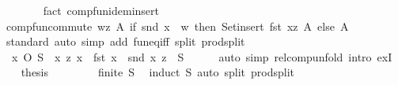 \begin{isabellebody}
\ \ \ \ \ \ \isamarkupfalse%
\ {\isacharparenleft}{\kern0pt}fact\ comp{\isacharunderscore}{\kern0pt}fun{\isacharunderscore}{\kern0pt}idem{\isacharunderscore}{\kern0pt}insert{\isacharparenright}{\kern0pt}\isanewline
\ \ \ \ \isamarkupfalse%
\ {\isachardoublequoteopen}comp{\isacharunderscore}{\kern0pt}fun{\isacharunderscore}{\kern0pt}commute\ {\isacharparenleft}{\kern0pt}{\isasymlambda}{\isacharparenleft}{\kern0pt}w{\isacharcomma}{\kern0pt}z{\isacharparenright}{\kern0pt}\ A{\isacharprime}{\kern0pt}{\isachardot}{\kern0pt}\ if\ snd\ x\ {\isacharequal}{\kern0pt}\ w\ then\ Set{\isachardot}{\kern0pt}insert\ {\isacharparenleft}{\kern0pt}fst\ x{\isacharcomma}{\kern0pt}z{\isacharparenright}{\kern0pt}\ A{\isacharprime}{\kern0pt}\ else\ A{\isacharprime}{\kern0pt}{\isacharparenright}{\kern0pt}{\isachardoublequoteclose}\isanewline
\ \ \ \ \ \ \isamarkupfalse%
\ standard\ {\isacharparenleft}{\kern0pt}auto\ simp\ add{\isacharcolon}{\kern0pt}\ fun{\isacharunderscore}{\kern0pt}eq{\isacharunderscore}{\kern0pt}iff\ split{\isacharcolon}{\kern0pt}\ prod{\isachardot}{\kern0pt}split{\isacharparenright}{\kern0pt}\isanewline
\ \ \isamarkupfalse%
\isanewline
\ \ \isamarkupfalse%
\ {\isacharasterisk}{\kern0pt}{\isacharcolon}{\kern0pt}\ {\isachardoublequoteopen}{\isacharbraceleft}{\kern0pt}x{\isacharbraceright}{\kern0pt}\ O\ S\ {\isacharequal}{\kern0pt}\ {\isacharbraceleft}{\kern0pt}{\isacharparenleft}{\kern0pt}x{\isacharprime}{\kern0pt}{\isacharcomma}{\kern0pt}\ z{\isacharparenright}{\kern0pt}{\isachardot}{\kern0pt}\ x{\isacharprime}{\kern0pt}\ {\isacharequal}{\kern0pt}\ fst\ x\ {\isasymand}\ {\isacharparenleft}{\kern0pt}snd\ x{\isacharcomma}{\kern0pt}\ z{\isacharparenright}{\kern0pt}\ {\isasymin}\ S{\isacharbraceright}{\kern0pt}{\isachardoublequoteclose}\isanewline
\ \ \ \ \isamarkupfalse%
\ {\isacharparenleft}{\kern0pt}auto\ simp{\isacharcolon}{\kern0pt}\ relcomp{\isacharunderscore}{\kern0pt}unfold\ intro{\isacharbang}{\kern0pt}{\isacharcolon}{\kern0pt}\ exI{\isacharparenright}{\kern0pt}\isanewline
\ \ \isamarkupfalse%
\ {\isacharquery}{\kern0pt}thesis\isanewline
\ \ \ \ \isamarkupfalse%
\ {\isacharasterisk}{\kern0pt}\ \isamarkupfalse%
\ {\isacartoucheopen}finite\ S{\isacartoucheclose}\ \isamarkupfalse%
\ {\isacharparenleft}{\kern0pt}induct\ S{\isacharparenright}{\kern0pt}\ {\isacharparenleft}{\kern0pt}auto\ split{\isacharcolon}{\kern0pt}\ prod{\isachardot}{\kern0pt}split{\isacharparenright}{\kern0pt}\isanewline
{}\isamarkupfalse%

\end{isabellebody}
